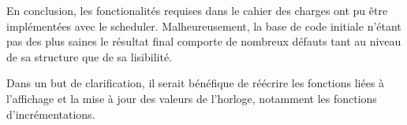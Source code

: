 En conclusion, les fonctionalités requises dans le cahier des charges ont pu être implémentées avec le scheduler. Malheureusement, la base de code initiale n'étant pas des plus saines le résultat final comporte de nombreux défauts tant au niveau de sa structure que de sa lisibilité.

Dans un but de clarification, il serait bénéfique de réécrire les fonctions liées à l'affichage et la mise à jour des valeurs de l'horloge, notamment les fonctions d'incrémentations.
